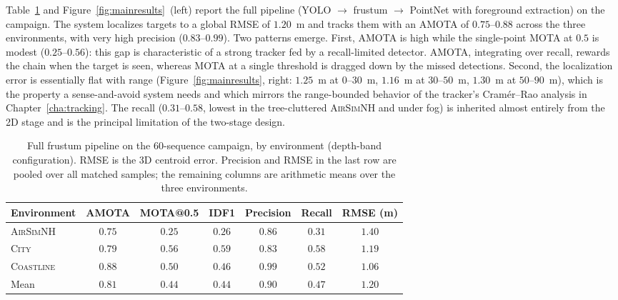 Table~\ref{tab:main} and Figure~\ref{fig:mainresults}~(left) report the full
pipeline (YOLO $\rightarrow$ frustum $\rightarrow$ PointNet with foreground
extraction) on the campaign. The system localizes targets to a global RMSE of $1.20$~m
and tracks them with an AMOTA of $0.75$--$0.88$ across the three
environments, with very high precision ($0.83$--$0.99$). Two patterns emerge.
First, AMOTA is high while the single-point MOTA at $0.5$ is modest
($0.25$--$0.56$): this gap is characteristic of a strong tracker fed by a
recall-limited detector. AMOTA, integrating over recall, rewards the chain when
the target is seen, whereas MOTA at a single threshold is dragged down by the missed
detections. Second, the localization error is essentially flat with range
(Figure~\ref{fig:mainresults}, right: $1.25$~m at $0$--$30$~m, $1.16$~m at $30$--$50$~m,
$1.30$~m at $50$--$90$~m), which is the property a sense-and-avoid system needs
and which mirrors the range-bounded behavior of the tracker's Cram\'er--Rao
analysis in Chapter~\ref{cha:tracking}. The recall ($0.31$--$0.58$, lowest in the
tree-cluttered \textsc{AirSimNH} and under fog) is inherited almost entirely from
the 2D stage and is the principal limitation of the two-stage design.

\begin{table}[H]
  \centering
  \caption{Full frustum pipeline on the $60$-sequence campaign, by environment
  (depth-band configuration). RMSE is the 3D centroid error. Precision and RMSE in
  the last row are pooled over all matched samples; the remaining columns are
  arithmetic means over the three environments.}
  \label{tab:main}
  \begin{tabular}{@{}lcccccc@{}}
    \toprule
    Environment & AMOTA & MOTA@0.5 & IDF1 & Precision & Recall & RMSE (m) \\
    \midrule
    \textsc{AirSimNH}  & $0.75$ & $0.25$ & $0.26$ & $0.86$ & $0.31$ & $1.40$ \\
    \textsc{City}      & $0.79$ & $0.56$ & $0.59$ & $0.83$ & $0.58$ & $1.19$ \\
    \textsc{Coastline} & $0.88$ & $0.50$ & $0.46$ & $0.99$ & $0.52$ & $1.06$ \\
    \midrule
    Mean               & $0.81$ & $0.44$ & $0.44$ & $0.90$ & $0.47$ & $1.20$ \\
    \bottomrule
  \end{tabular}
\end{table}

